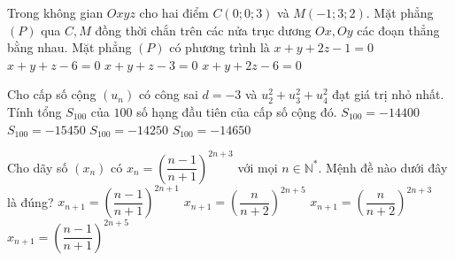 \begin{ex}%
Trong không gian $Oxyz$ cho hai điểm $C\left(0;0;3\right)$ và $M\left(-1;3;2\right)$. Mặt phẳng $\left(P\right)$ qua $C, M$ đồng thời chắn trên các  nửa trục dương $Ox, Oy$ các đoạn thẳng bằng nhau. Mặt phẳng $\left(P\right)$ có phương trình là
\choice
{$x + y + 2z - 1 = 0$}
{$x + y + z - 6 = 0$}
{$x + y + z - 3 = 0$}
{\True $x + y + 2z - 6 = 0$}
\end{ex}
\begin{ex}%
Cho cấp số cộng $\left(u_n\right)$ có công sai $d = - 3$ và $u_2^2 + u_3^2 + u_4^2$ đạt giá trị nhỏ nhất. Tính tổng $S_{100}$ của $100$ số hạng đầu tiên của cấp số cộng đó.
\choice
{$S_{100} = - 14400$}
{$S_{100} = - 15450$}
{\True $S_{100} = - 14250$}
{$S_{100} = - 14650$}
\end{ex}

\begin{ex}%
Cho dãy số $\left(x_n\right)$ có $x_n = \left(\dfrac{n - 1}{n + 1}\right)^{2n + 3}$ với mọi $n \in \mathbb{N}^{*}$. Mệnh đề nào dưới đây là đúng?
\choice
{$x_{n + 1} = \left(\dfrac{n - 1}{n + 1}\right)^{2n + 1}$}
{\True $x_{n + 1} = \left(\dfrac{n}{n + 2}\right)^{2n + 5}$}
{$x_{n + 1} = \left(\dfrac{n}{n + 2}\right)^{2n + 3}$}
{$x_{n + 1} = \left(\dfrac{n - 1}{n + 1}\right)^{2n + 5}$}
\end{ex}

